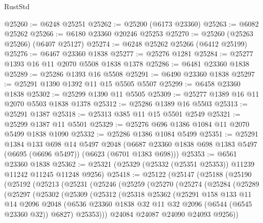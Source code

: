 \begin{lexlean}{RustStd}
\begin{coremodule}
@25260 := @6248 @25251
@25262 := @25200 (@6173 @23360)
@25263 := @6082 @25262
@25266 := @6180 @23360 @20246 @25253
@25270 := @25260 (@25263 @25266) (@6407 @25127)
@25274 := @6248 @25262 @25266 (@6412 @25199)
@25276 := @6467 @23360 @1838
@25277 := @25276 @1281
@25284 := @25277 @1393 @16 @11 @2070 @5508 @1838 @1378
@25286 := @6481 @23360 @1838
@25289 := @25286 @1393 @16 @5508
@25291 := @6490 @23360 @1838
@25297 := @25291 @1390 @1392 @11 @15 @5505 @5507
@25299 := @6458 @23360 @1838
@25302 := @25299 @1390 @11 @5505
@25309 := @25277 @1389 @16 @11 @2070 @5503 @1838 @1378
@25312 := @25286 @1389 @16 @5503
@25313 := @25291 @1387
@25318 := @25313 @385 @11 @15 @5501 @2549
@25321 := @25299 @1387 @11 @5501
@25329 := @25276 @696 @1386 @1084 @11 @2070 @5499 @1838 @1090
@25332 := @25286 @1386 @1084 @5499
@25351 := @25291
    @1384
    @133
    @698
    @14
    @5497
    @2048
    (@6687 @23360 @1838 @698 @1383 @5497 (@6695 (@6696 @5497)) (@6623 (@6701 @1383 @698)))
@25353 := @6561 @23360 @1838
@25362 := @25321 (@25329 (@25332 (@25351 @25353)) @11239 @11242 @11245 @11248 @9256)
@25418 := @25122
    (@25147
      (@25188
        (@25190
          (@25192
            (@25213
              (@25231
                (@25246
                  (@25259
                    (@25270
                      (@25274
                        (@25284
                          (@25289
                            (@25297
                              (@25302
                                (@25309
                                  (@25312
                                    (@25318
                                      @25362
                                      (@25291
                                        @158
                                        @133
                                        @11
                                        @14
                                        @2096
                                        @2048
                                        (@6536
                                          @23360
                                          @1838
                                          @32
                                          @11
                                          @32
                                          @2096
                                          (@6544 (@6545 @23360 @32))
                                          @6827)
                                        @25353)))
                                  @24084
                                  @24087
                                  @24090
                                  @24093
                                  @9256))

\end{coremodule}
\end{lexlean}
